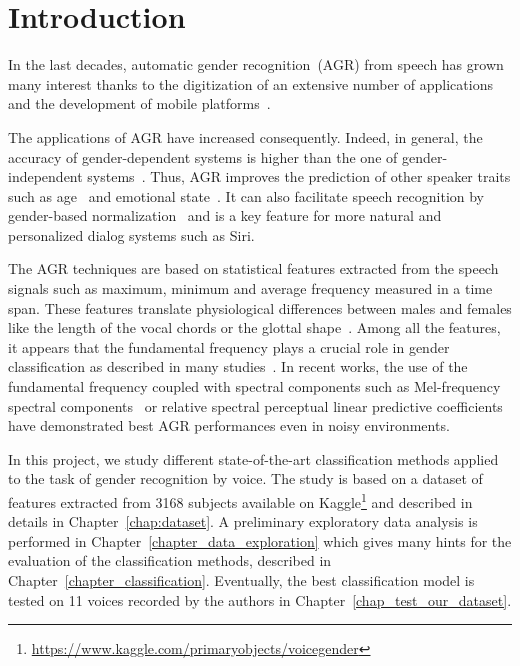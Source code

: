 

\chapter{Introduction}
\label{chap:introduction}

In the last decades, automatic gender recognition~(AGR) from speech has grown many interest thanks to the digitization of an extensive number of applications and the development of mobile platforms~\cite{Wu_JASA_1991, Wu_JASA_1991_2, Childers_ICASSP_1988, Harb2005, Zeng2006, Sorokin2008, Metze_ICASSP_2007, Bocklet_ICASSP_2008}.

The applications of AGR have increased consequently. Indeed, in general, the accuracy of gender-dependent systems is higher than the one of gender-independent systems~\cite{Harb2005}. Thus, AGR improves the prediction of other speaker traits such as age~\cite{Levi2015} and emotional state~\cite{Bisio2013, Ververidis2004}. It can also facilitate speech recognition by gender-based normalization~\cite{Wegmann_ICASSP_1996} and is a key feature for more natural and personalized dialog systems such as Siri.

The AGR techniques are based on statistical features extracted from the speech signals such as maximum, minimum and average frequency measured in a time span. These features translate physiological differences between males and females like the length of the vocal chords or the glottal shape~\cite{Titze_JASA_1989}. Among all the features, it appears that the fundamental frequency plays a crucial role in gender classification as described in many studies~\cite{Hollien1967, Wu_JASA_1991, Poon2015}. In recent works, the use of the fundamental frequency coupled with spectral components such as Mel-frequency spectral components~\cite{Gupta2016} or relative spectral perceptual linear predictive coefficients~\cite{Zeng2006} have demonstrated best AGR performances even in noisy environments.

In this project, we study different state-of-the-art classification methods applied to the task of gender recognition by voice. The study is based on a dataset of features extracted from \num{3168} subjects available on Kaggle\footnote{\url{https://www.kaggle.com/primaryobjects/voicegender}} and described in details in Chapter~\ref{chap:dataset}. A preliminary exploratory data analysis is performed in Chapter~\ref{chapter_data_exploration} which gives many hints for the evaluation of the classification methods, described in Chapter~\ref{chapter_classification}. Eventually, the best classification model is tested on \num{11} voices recorded by the authors in Chapter~\ref{chap_test_our_dataset}.
  